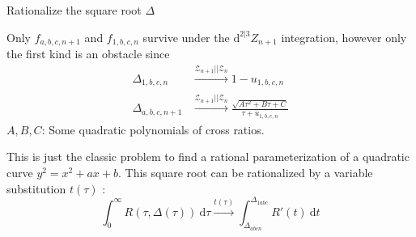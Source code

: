 \documentclass[10pt]{beamer}
\newcommand{\dif}{\mathrm{d}}
\begin{document}
\begin{frame}{Rationalize the square root $\Delta$}

Only $f_{a,b,c,n+1}$ and $f_{1,b,c,n}$ survive under the $\dif^{2\vert3}Z_{n+1}$ integration, \newline
however only the first kind is an obstacle
since
\begin{align*}
\Delta_{1,b,c,n} &\xrightarrow[]{\mathcal{Z}_{n+1}\vert\vert \mathcal{Z}_{n}} 1-u_{1,b,c,n}\\
\Delta_{a,b,c,n+1}&\xrightarrow[]{\mathcal{Z}_{n+1}\vert\vert \mathcal{Z}_{n}}\frac{\sqrt{A \tau^{2}+B\tau+C}}{\tau+u_{1,b,c,n}}
\end{align*}
$A,B,C$: Some quadratic polynomials of cross ratios. 

This is just the classic problem to find a rational parameterization of a quadratic curve $y^{2}=x^{2}+ax+b$. \newline 
This square root can be rationalized by a variable substitution $t(\tau)$ :
\[
  \int_{0}^{\infty} R(\tau,\Delta(\tau))\:\dif\tau \xrightarrow[]{t(\tau)}\int_{\Delta_{abcn}}^{\Delta_{1abc}} R'(t)\:\dif t
  \]


\end{frame}
\end{document}
